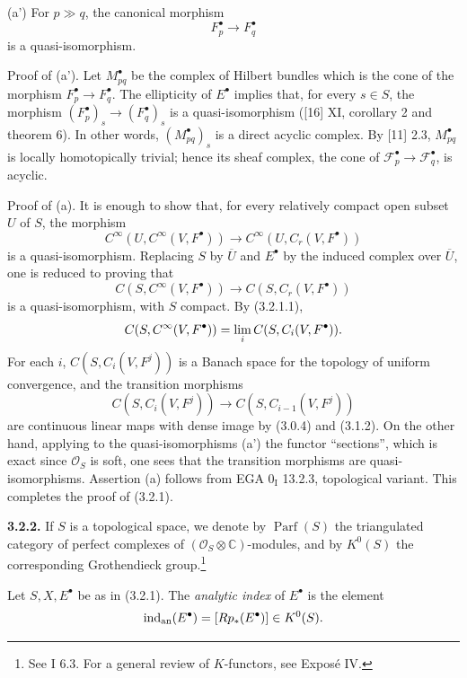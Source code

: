 \documentclass[11pt]{article}
\newcommand{\Parf}{\operatorname{Parf}}
\begin{document}
(a') For $p\gg q$, the canonical morphism
\[
 F_p^\bullet\longrightarrow F_q^\bullet
\]
is a quasi-isomorphism.

Proof of (a'). Let $M_{pq}^\bullet$ be the complex of Hilbert bundles which is the cone of the morphism $F_p^\bullet\to F_q^\bullet$. The ellipticity of $E^\bullet$ implies that, for every $s\in S$, the morphism $(F_p^\bullet)_s\to(F_q^\bullet)_s$ is a quasi-isomorphism ([16] XI, corollary 2 and theorem 6). In other words, $(M_{pq}^\bullet)_s$ is a direct acyclic complex. By [11] 2.3, $M_{pq}^\bullet$ is locally homotopically trivial; hence its sheaf complex, the cone of $\mathcal F_p^\bullet\to\mathcal F_q^\bullet$, is acyclic.

Proof of (a). It is enough to show that, for every relatively compact open subset $U$ of $S$, the morphism
\[
 C^\infty(U,C^\infty(V,F^\bullet))\longrightarrow C^\infty(U,C_r(V,F^\bullet))
\]
is a quasi-isomorphism. Replacing $S$ by $\overline U$ and $E^\bullet$ by the induced complex over $\overline U$, one is reduced to proving that
\[
 C(S,C^\infty(V,F^\bullet))\longrightarrow C(S,C_r(V,F^\bullet))
\]
is a quasi-isomorphism, with $S$ compact. By (3.2.1.1),
\[
 C(S,C^\infty(V,F^\bullet))=\operatorname*{lim}_i C(S,C_i(V,F^\bullet)).
\]
For each $i$, $C(S,C_i(V,F^j))$ is a Banach space for the topology of uniform convergence, and the transition morphisms
\[
 C(S,C_i(V,F^j))\longrightarrow C(S,C_{i-1}(V,F^j))
\]
are continuous linear maps with dense image by (3.0.4) and (3.1.2). On the other hand, applying to the quasi-isomorphisms (a') the functor ``sections'', which is exact since $\mathcal O_S$ is soft, one sees that the transition morphisms are quasi-isomorphisms. Assertion (a) follows from EGA $0_{\mathrm I}$ 13.2.3, topological variant. This completes the proof of (3.2.1).

\textbf{3.2.2.} If $S$ is a topological space, we denote by $\Parf(S)$ the triangulated category of perfect complexes of $(\mathcal O_S\otimes\mathbb C)$-modules, and by $K^0(S)$ the corresponding Grothendieck group.\footnote{See I 6.3. For a general review of $K$-functors, see Exposé IV.}

Let $S,X,E^\bullet$ be as in (3.2.1). The \emph{analytic index} of $E^\bullet$ is the element
\[
 \operatorname{ind}_{\mathrm{an}}(E^\bullet)=[Rp_*(E^\bullet)]\in K^0(S).
\]
\end{document}
